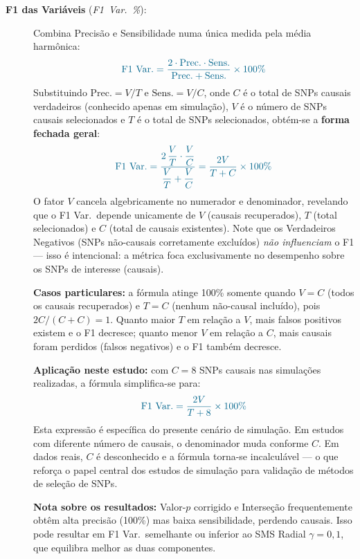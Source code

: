 \documentclass[
    12pt,
    a4paper,
    oneside,
    english,
    french,
    spanish,
    brazil
    ]{abntex2}
\newcommand{\novo}[1]{\textcolor{corNova}{#1}}
\begin{document}
\begin{description}
  \item[\novo{\textbf{F1 das Variáveis} (\textit{F1\ Var.\ \%}):}]
  \novo{Combina Precisão e Sensibilidade numa única medida pela média harmônica:}
  \begin{equation}
    \novo{\text{F1\ Var.} = \frac{2 \cdot \text{Prec.} \cdot \text{Sens.}}{\text{Prec.} + \text{Sens.}} \times 100\%}
  \label{eq:f1geral}
  \end{equation}
  \novo{Substituindo $\text{Prec.} = V/T$ e $\text{Sens.} = V/C$, onde $C$ é o total de SNPs causais verdadeiros (conhecido apenas em simulação), $V$ é o número de SNPs causais selecionados e $T$ é o total de SNPs selecionados, obtém-se a \textbf{forma fechada geral}:}
  \begin{equation}
    \novo{\text{F1\ Var.} = \frac{2\,\dfrac{V}{T}\cdot\dfrac{V}{C}}{\dfrac{V}{T}+\dfrac{V}{C}} = \frac{2V}{T + C} \times 100\%}
  \label{eq:f1fechada}
  \end{equation}
  \novo{O fator $V$ cancela algebricamente no numerador e denominador, revelando que o F1 Var.\ depende unicamente de $V$ (causais recuperados), $T$ (total selecionados) e $C$ (total de causais existentes). Note que os Verdadeiros Negativos (SNPs não-causais corretamente excluídos) \emph{não influenciam} o F1 — isso é intencional: a métrica foca exclusivamente no desempenho sobre os SNPs de interesse (causais).}

  \novo{\textbf{Casos particulares:} a fórmula atinge 100\% somente quando $V = C$ (todos os causais recuperados) e $T = C$ (nenhum não-causal incluído), pois $2C/(C+C) = 1$. Quanto maior $T$ em relação a $V$, mais falsos positivos existem e o F1 decresce; quanto menor $V$ em relação a $C$, mais causais foram perdidos (falsos negativos) e o F1 também decresce.}

  \novo{\textbf{Aplicação neste estudo:} com $C = 8$ SNPs causais nas simulações realizadas, a fórmula simplifica-se para:}
  \begin{equation}
    \novo{\text{F1\ Var.} = \frac{2V}{T + 8} \times 100\%}
  \label{eq:f1c8}
  \end{equation}
  \novo{Esta expressão é específica do presente cenário de simulação. Em estudos com diferente número de causais, o denominador muda conforme $C$. Em dados reais, $C$ é desconhecido e a fórmula torna-se incalculável — o que reforça o papel central dos estudos de simulação para validação de métodos de seleção de SNPs.}

  \novo{\textbf{Nota sobre os resultados:} Valor-$p$ corrigido e Interseção frequentemente obtêm alta precisão (100\%) mas baixa sensibilidade, perdendo causais. Isso pode resultar em F1 Var.\ semelhante ou inferior ao SMS Radial $\gamma = 0{,}1$, que equilibra melhor as duas componentes.}

\end{description}
\end{document}
